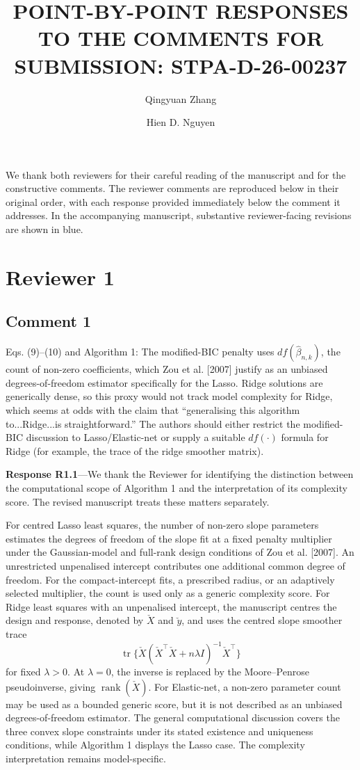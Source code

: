 \documentclass[11pt]{article}
\newcommand{\response}[1]{\par\noindent\textbf{Response #1}---}
\begin{document}
\title{POINT-BY-POINT RESPONSES TO THE COMMENTS FOR SUBMISSION: STPA-D-26-00237}
\author{Qingyuan Zhang \and Hien D. Nguyen}
\date{}
\maketitle



We thank both reviewers for their careful reading of the manuscript and for the constructive comments. The reviewer comments are reproduced below in their original order, with each response provided immediately below the comment it addresses. In the accompanying manuscript, substantive reviewer-facing revisions are shown in blue.


\section*{Reviewer 1}

\subsection*{Comment 1}
Eqs. (9)--(10) and Algorithm 1: The modified-BIC penalty uses $df(\widehat\beta_{n,k})$, the count of non-zero coefficients, which Zou et al. [2007] justify as an unbiased degrees-of-freedom estimator specifically for the Lasso. Ridge solutions are generically dense, so this proxy would not track model complexity for Ridge, which seems at odds with the claim that ``generalising this algorithm to...Ridge...is straightforward.'' The authors should either restrict the modified-BIC discussion to Lasso/Elastic-net or supply a suitable $df(\cdot)$ formula for Ridge (for example, the trace of the ridge smoother matrix).

\response{R1.1}We thank the Reviewer for identifying the distinction between the computational scope of Algorithm 1 and the interpretation of its complexity score. The revised manuscript treats these matters separately.

For centred Lasso least squares, the number of non-zero slope parameters estimates the degrees of freedom of the slope fit at a fixed penalty multiplier under the Gaussian-model and full-rank design conditions of Zou et al. [2007]. An unrestricted unpenalised intercept contributes one additional common degree of freedom. For the compact-intercept fits, a prescribed radius, or an adaptively selected multiplier, the count is used only as a generic complexity score. For Ridge least squares with an unpenalised intercept, the manuscript centres the design and response, denoted by $\check X$ and $\check y$, and uses the centred slope smoother trace
\[
\operatorname{tr}\{\check X(\check X^\top \check X+n\lambda I)^{-1}\check X^\top\}
\]
for fixed $\lambda>0$. At $\lambda=0$, the inverse is replaced by the Moore--Penrose pseudoinverse, giving $\operatorname{rank}(\check X)$. For Elastic-net, a non-zero parameter count may be used as a bounded generic score, but it is not described as an unbiased degrees-of-freedom estimator. The general computational discussion covers the three convex slope constraints under its stated existence and uniqueness conditions, while Algorithm 1 displays the Lasso case. The complexity interpretation remains model-specific.
\end{document}
